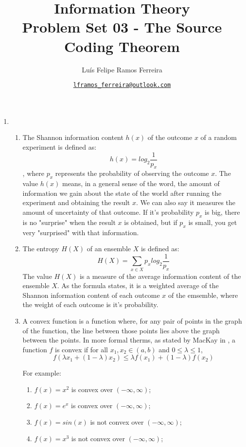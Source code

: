 \documentclass{article}
\title{Information Theory \\ \large Problem Set 03 - The Source Coding Theorem}
\author{Luís Felipe Ramos Ferreira}
\date{\href{mailto:lframos\_ferreira@outlook.com}{\texttt{lframos\_ferreira@outlook.com}}
}
\begin{document}
\maketitle

\begin{enumerate}

	\item \begin{enumerate}

		      \item The Shannon information content \(h(x)\) of the outcome \(x\) of a random experiment is defined as:
		            \[ h(x) = log_2 \frac{1}{p_x}\],
		            where \(p_x\) represents the probability of observing the outcome \(x\). The value \(h(x)\) means, in a general sense of the word, the amount of information we gain about the state of the world after running the experiment and obtaining the result \(x\). We can also say it measures the amount of uncertainty of that outcome. If it's probability \(p_x\) is big, there is no "surprise" when the result \(x\) is obtained, but if \(p_x\) is small, you get very "surprised" with that information.

		      \item The entropy \(H(X)\) of an ensemble \(X\) is defined as:
		            \[H(X) = \sum_{x \in X} p_x log_2 \frac{1}{p_x}\]
		            The value \(H(X)\) is a measure of the average information content of the ensemble \(X\). As the formula states, it is a weighted average of the Shannon information content of each outcome \(x\) of the emsemble, where the weight of each outcome is it's probability.

		      \item A convex function is a function where, for any pair of points in the graph of the function, the line between those points lies above the graph between the points. In more formal therms, as stated by MacKay in \cite{MacKay}, a function \(f\) is convex if for all \(x_1, x_2 \in (a, b)\) and \(0 \leq \lambda \leq 1\),
		            \[f(\lambda x_1 + (1 - \lambda)x_2) \leq \lambda f(x_1) + (1 - \lambda) f(x_2)\]

		            For example:

		            \begin{enumerate}
			            \item \(f(x) = x^2\) is convex over \((-\infty, \infty)\);
			            \item \(f(x) = e^x\) is convex over \((-\infty, \infty)\);
			            \item \(f(x) = sin(x)\) is not convex over \((-\infty, \infty)\);
			            \item \(f(x) = x^3\) is not convex over \((-\infty, \infty)\);
		            \end{enumerate}


\end{enumerate}
\end{enumerate}
\end{document}
